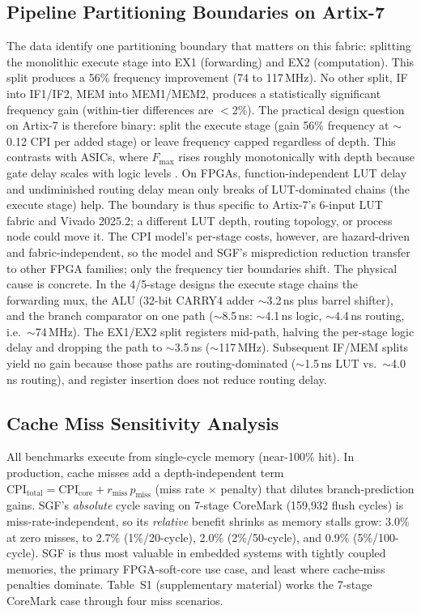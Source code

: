 \documentclass[acmsmall,nonacm,screen]{acmart}
\begin{document}
\subsection{Pipeline Partitioning Boundaries on Artix-7}
\label{sec:partitioning}

The data identify one partitioning boundary that matters on this fabric: splitting the monolithic execute stage into EX1 (forwarding) and EX2 (computation).
This split produces a 56\% frequency improvement (74 to 117\,MHz).
No other split, IF into IF1/IF2, MEM into MEM1/MEM2, produces a statistically significant frequency gain (within-tier differences are $<$2\%).
The practical design question on Artix-7 is therefore binary: split the execute stage (gain 56\% frequency at $\sim$0.12 CPI per added stage) or leave frequency capped regardless of depth.
This contrasts with ASICs, where $F_{\max}$ rises roughly monotonically with depth because gate delay scales with logic levels \cite{hrishikesh2002optimal}. On FPGAs, function-independent LUT delay and undiminished routing delay \cite{kuon2007measuring} mean only breaks of LUT-dominated chains (the execute stage) help.
The boundary is thus specific to Artix-7's 6-input LUT fabric and Vivado 2025.2; a different LUT depth, routing topology, or process node could move it. The CPI model's per-stage costs, however, are hazard-driven and fabric-independent, so the model and SGF's misprediction reduction transfer to other FPGA families; only the frequency tier boundaries shift.
The physical cause is concrete. In the 4/5-stage designs the execute stage chains the forwarding mux, the ALU (32-bit CARRY4 adder $\sim$3.2\,ns plus barrel shifter), and the branch comparator on one path ($\sim$8.5\,ns: $\sim$4.1\,ns logic, $\sim$4.4\,ns routing, i.e.\ $\sim$74\,MHz). The EX1/EX2 split registers mid-path, halving the per-stage logic delay and dropping the path to $\sim$3.5\,ns ($\sim$117\,MHz). Subsequent IF/MEM splits yield no gain because those paths are routing-dominated ($\sim$1.5\,ns LUT vs.\ $\sim$4.0\,ns routing), and register insertion does not reduce routing delay.

\subsection{Cache Miss Sensitivity Analysis}
\label{sec:cache_miss}

All benchmarks execute from single-cycle memory (near-100\% hit). In production, cache misses add a depth-independent term $\text{CPI}_{\text{total}} = \text{CPI}_{\text{core}} + r_{\text{miss}}\,p_{\text{miss}}$ (miss rate $\times$ penalty) that dilutes branch-prediction gains.
SGF's \emph{absolute} cycle saving on 7-stage CoreMark (159{,}932 flush cycles) is miss-rate-independent, so its \emph{relative} benefit shrinks as memory stalls grow: 3.0\% at zero misses, to 2.7\% (1\%/20-cycle), 2.0\% (2\%/50-cycle), and 0.9\% (5\%/100-cycle).
SGF is thus most valuable in embedded systems with tightly coupled memories, the primary FPGA-soft-core use case, and least where cache-miss penalties dominate.
Table~S1 (supplementary material) works the 7-stage CoreMark case through four miss scenarios.
\end{document}
